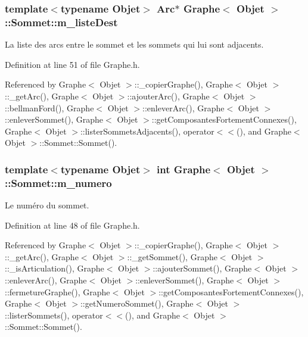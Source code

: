 \hypertarget{class_graphe_1_1_sommet_ab172987c3dac44234c56949387a0a2d4}{
\subsubsection[{m\_\-listeDest}]{\setlength{\rightskip}{0pt plus 5cm}template$<$typename Objet$>$ {\bf Arc}$\ast$ {\bf Graphe}$<$ Objet $>$::{\bf Sommet::m\_\-listeDest}}}
\label{class_graphe_1_1_sommet_ab172987c3dac44234c56949387a0a2d4}


La liste des arcs entre le sommet et les sommets qui lui sont adjacents. 



Definition at line 51 of file Graphe.h.



Referenced by Graphe$<$ Objet $>$::\_\-copierGraphe(), Graphe$<$ Objet $>$::\_\-getArc(), Graphe$<$ Objet $>$::ajouterArc(), Graphe$<$ Objet $>$::bellmanFord(), Graphe$<$ Objet $>$::enleverArc(), Graphe$<$ Objet $>$::enleverSommet(), Graphe$<$ Objet $>$::getComposantesFortementConnexes(), Graphe$<$ Objet $>$::listerSommetsAdjacents(), operator$<$$<$(), and Graphe$<$ Objet $>$::Sommet::Sommet().

\hypertarget{class_graphe_1_1_sommet_a02b6810e0eb22f2d412c60dba9e01f4d}{
\subsubsection[{m\_\-numero}]{\setlength{\rightskip}{0pt plus 5cm}template$<$typename Objet$>$ int {\bf Graphe}$<$ Objet $>$::{\bf Sommet::m\_\-numero}}}
\label{class_graphe_1_1_sommet_a02b6810e0eb22f2d412c60dba9e01f4d}


Le numéro du sommet. 



Definition at line 48 of file Graphe.h.



Referenced by Graphe$<$ Objet $>$::\_\-copierGraphe(), Graphe$<$ Objet $>$::\_\-getArc(), Graphe$<$ Objet $>$::\_\-getSommet(), Graphe$<$ Objet $>$::\_\-isArticulation(), Graphe$<$ Objet $>$::ajouterSommet(), Graphe$<$ Objet $>$::enleverArc(), Graphe$<$ Objet $>$::enleverSommet(), Graphe$<$ Objet $>$::fermetureGraphe(), Graphe$<$ Objet $>$::getComposantesFortementConnexes(), Graphe$<$ Objet $>$::getNumeroSommet(), Graphe$<$ Objet $>$::listerSommets(), operator$<$$<$(), and Graphe$<$ Objet $>$::Sommet::Sommet().

